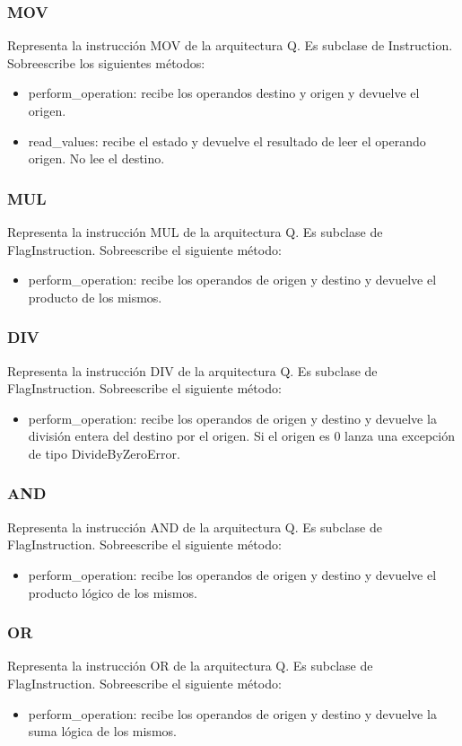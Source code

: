 \subsubsection{MOV}
Representa la instrucción MOV de la arquitectura Q. Es subclase de Instruction. Sobreescribe los siguientes métodos:
\begin{itemize}
\item perform\_operation: recibe los operandos destino y origen y devuelve el origen.
\item read\_values: recibe el estado y devuelve el resultado de leer el operando origen. No lee el destino.
\end{itemize}

\subsubsection{MUL}
Representa la instrucción MUL de la arquitectura Q. Es subclase de FlagInstruction. Sobreescribe el siguiente método:
\begin{itemize}
\item perform\_operation: recibe los operandos de origen y destino y devuelve el producto de los mismos.
\end{itemize}

\subsubsection{DIV}
Representa la instrucción DIV de la arquitectura Q. Es subclase de FlagInstruction. Sobreescribe el siguiente método:
\begin{itemize}
\item perform\_operation: recibe los operandos de origen y destino y devuelve la división entera del destino por el origen. Si el origen es 0 lanza una excepción de tipo DivideByZeroError.
\end{itemize}

\subsubsection{AND}
Representa la instrucción AND de la arquitectura Q. Es subclase de FlagInstruction. Sobreescribe el siguiente método:
\begin{itemize}
\item perform\_operation: recibe los operandos de origen y destino y devuelve el producto lógico de los mismos.
\end{itemize}

\subsubsection{OR}
Representa la instrucción OR de la arquitectura Q. Es subclase de FlagInstruction. Sobreescribe el siguiente método:
\begin{itemize}
\item perform\_operation: recibe los operandos de origen y destino y devuelve la suma lógica de los mismos.
\end{itemize}



